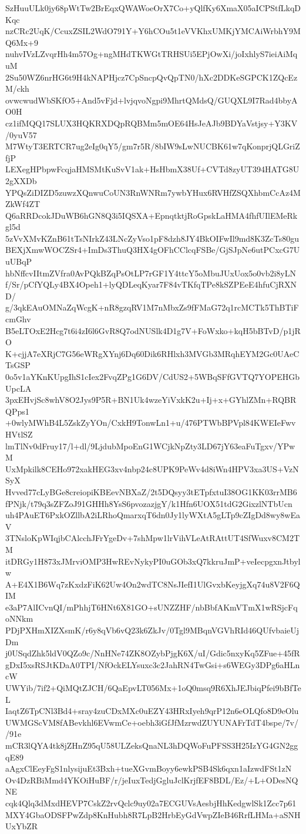 SzHuuULk0jy68pWtTw2BrEqxQWAWoeOrX7Co+yQlfKy6XmaX05aICPStfLkqDKqc
nzCRc2UqK/CcuxZSIL2WdO791Y+Y6hCOu5t1eVVKhxUMKjYMCAiWrbhY9MQ6Mx+9
nuhvIVzLZvqrHh4m57Og+ngMHdTKWGtTRHSUi5EPjOwXi/joIxhlyS7ieiAiMquM
2Su50WZ6nrHG6t9H4kNAPHjcz7CpSncpQvQpTN0/hXc2DDKeSGPCK1ZQcEzM/ckh
ovwcwudWbSKfO5+And5vFjd+lvjqvoNgpi9MhrtQMdsQ/GUQXL9I7Rad4bbyAO0H
cz1ifMQQ17SLUX3HQKRXDQpRQBMm5mOE64HsJeAJb9BDYaVstjsy+Y3KV/0yuV57
M7WtyT3ERTCR7ug2eIg0qY5/gm7r5R/8bIW9sLwNUCBK61w7qKonprjQLGriZfjP
LEXegHPbpwFcqjaHMSMtKuSvV1ak+HsHbmX38Uf+CVTd8zyUT394HATG8U2gXXDb
YPQsZiDIZD5zuwzXQnwuCoUN3RnWNRm7ywbYHux6RVHfZSQXhbmCcAz4MZkWf4ZT
Q6aRRDcokJDuWB6hGN8Q3i5IQSXA+EpnqtktjRoGpskLaHMA4fhfUIlEMeRkgl5d
5zVvXMvKZnB61tTsNIrkZ43LNcZyVso1pF8dzh8JY4BkOIFwIl9md8K3ZcTs80gu
BEXjXmwWOCZSr4+ImDs3ThuQ3HX4gOFhCClcqFSBe/GjSJpNe6utPCxcG7UuUBqP
hbNffcvIItmZVfra0AvPQkBZqPsOtLP7rGF1Y4ttcY5oMbuJUxUox5o0vb2i8yLN
f/Sr/pCfYQLy4BX4Opeh1+lyQDLeqKyar7F84vTKfqTPe8kSZPEeE4hfuCjRXND/
g/3qkEAuOMNaZqWcgK+nR8gzqRV1M7nMbxZs9fFMaG72q1rcMCTk5ThBTiFcmGhv
B5eLTOxE2Hcg7t6i4zI6l6GvR8Q7odNUSlk4D1g7V+FoWxko+kqH5bBTvD/p1jRO
K+cjjA7eXRjC7G56eWRgXYnj6Dq60Dik6RHlxh3MVGb3MRqhEYM2Gc0UAeCTsGSP
0o5v1aYKnKUpgIhS1cIex2FvqZPg1G6DV/CdUS2+5WBqSFfGVTQ7YOPEHGbUpcLA
3pxEHvjSc8whV8O2Jys9P5R+BN1Uk4wzeYiVxkK2u+Ij+x+GYhlZMn+RQBRQPps1
+0wlyMWhB4L5ZskZyYOn/CxkH9TonwLn1+u/476PTWbBPVpl84KWEIeFwvHVtlSZ
lmTlNv0dFruy17/l+dl/9LjdubMpoEnG1WCjkNpZty3LD67jY63eaFuTgxv/YPwM
UxMpkilk8CEHo972xakHEG3xv4nbp24c8UPK9PeWv4d8iWn4HPV3xa3US+VzNSyX
Hvved77cLyBGe8creiopiKBEevNBXaZ/2t5DQsyy3tETpfxtuI38OG1KK03rrMB6
fPNjk/t79q3sZFZoJ91GHHh8YsS6pvozazjgY/k1Hfn6UOX51tdG2GixzlNTbUcn
uh4PAuET6PxkOZllbA2iLRhoQmarxqT6dn0Jy1lyWXtA5gLTp9cZIgDd8wy8wEaV
3TNsloKpWIqjbCAlcchJFrYgeDv+7shMpw1lrVihVLeAtRAttUT4SfWuxv8CM2TM
itDRGy1H873xJMrviOMP3HwREvNykyPI0uGOb3xQ7kkruJmP+veIecpgxnJtbylw
A+E4X1B6Wq7zKxdzFiK62Uw4On2wdTC8NsJIefI1UlGvxbKeyjgXq74u8V2F6QIM
e3aP7AlICvnQI/mPhhjT6HNt6X81GO+sUNZZHF/nbBbfAKmVTmX1wRSjcFqoNNkm
PDjPXHmXIZXsmK/r6y8qVb6vQ23k6ZkJv/0Tgl9MBqnVGVhRId46QUfvbaieUjDm
j0USqdZhk5ldV0QZo9c/NnHNe74ZK8OZybPjgK6X/uI/Gdic5nxyKq5ZFue+45fR
gDxI5xsRSJtKDaA0TPI/NfOckELYsuxc3c2JahRN4TwGsi+s6WEGy3DPg6aHLncW
UWYib/7if2+QiMQtZJCH/6QaEpvLT056Mx+1oQ0msq9R6XhJEJbiqPfei9bBfTeL
IaqtZ6TpCNl3Bd4+sray4zuCDxMXc0uEZY43HRxIyeh9qrP12n6eOLQfo8D9eOlu
UWMGScVM8fABevkhl6EVwmCe+oebh3iGfJfMzrwdZUYUNAFrTdT4bspe/7v//91e
mCR3lQYA4tk8jZHnZ95qU58ULZeksQnaNL3hDQWoFuPFSS3H25IzYG4GN2ggqE89
aAgxClEeyFgS1nlysijuEt3Bxh+tueXGvmBoyy6ewkPSB4Sk6qxn1aIzwdFSt1zN
Ov4DzRBiMmd4YKOiHuBF/r/jeIuxTedjGgluJclKrjfEF8BDL/Ez/+L+ODesNQNE
cqk4Qlq3dMxdHEVP7CskZ2rvQclc9uy02a7ECGUVsAesbjHhKedgwlSk1Zcc7p61
MXY4GbaODSFPwZdp8KnHubh8R7LpB2HrbEyGdVwpZIeB46RrfLHMa+aSNHUxYbZR
